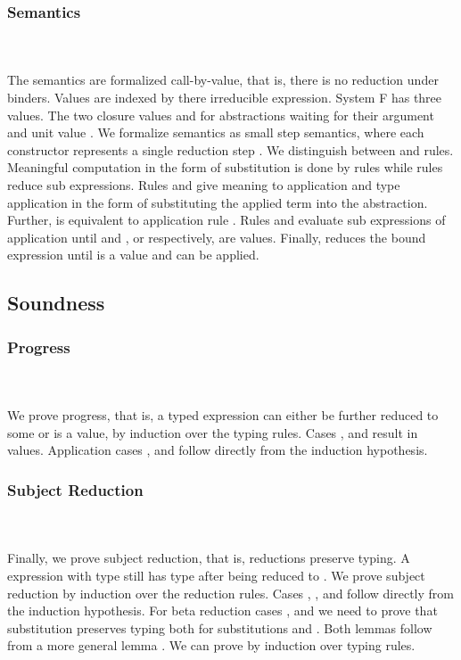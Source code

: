 \subsubsection{Semantics}\hfill\\\\
The semantics are formalized call-by-value, that is, there is no reduction under binders. Values are indexed by there irreducible expression.
\FVal
System F has three values. The two closure values  and  for abstractions waiting for their argument and unit value .
We formalize semantics as small step semantics, where each constructor represents a single reduction step   .
We distinguish between  and  rules. Meaningful computation in the form of substitution is done by  rules while  rules reduce sub expressions.
\FSemantics
Rules  and  give meaning to application and type application in the form of substituting the applied term into the abstraction. Further,  is equivalent to application rule . Rules  and  evaluate sub expressions of application until  and , or  respectively, are values. Finally,  reduces the bound expression  until  is a value and  can be applied.    
\subsection{Soundness}

\subsubsection{Progress}\hfill\\\\
We prove progress, that is, a typed expression    \Data{:}  can either be further reduced to some  or  is a value, by induction over the typing rules. 
\FProgress
Cases ,  and  result in values. Application cases ,  and  follow directly from the induction hypothesis. 
\subsubsection{Subject Reduction}\hfill\\\\
Finally, we prove subject reduction, that is, reductions preserve typing. A expression  with type  still has type  after being reduced to . We prove subject reduction by induction over the reduction rules. 
\FSubjectReduction
Cases , ,  and  follow directly from the induction hypothesis. For beta reduction cases ,  and  we need to prove that substitution preserves typing both for substitutions  \Data{[}   \Data{]} and  \Data{[}   \Data{]}. Both lemmas follow from a more general lemma .
\Fpreserves
We can prove  by induction over typing rules.